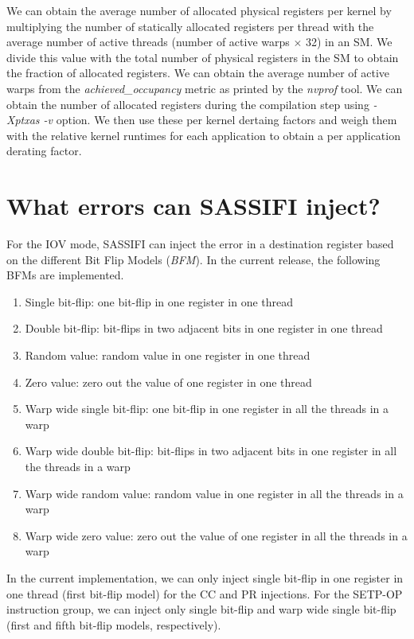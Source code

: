 We can obtain the average number of allocated physical registers per kernel by
multiplying the number of statically allocated registers per thread with the
average number of active threads (number of active warps $\times$ 32) in an SM.
We divide this value with the total number of physical registers in the SM to
obtain the fraction of allocated registers.  We can obtain the average number
of active warps from the {\it achieved\_occupancy} metric as printed by the
{\it nvprof} tool. We can obtain the number of allocated registers during the
compilation step using {\it -Xptxas -v} option. We then use these per kernel
dertaing factors and weigh them with the relative kernel runtimes for each
application to obtain a per application derating factor.

\section{What errors can SASSIFI inject?}
\label{sec:what}

For the IOV mode, SASSIFI can inject the error in a destination register based on
the different Bit Flip Models ({\it BFM}).  In the current release, the following BFMs are implemented. 

\begin{enumerate}
\item Single bit-flip: one bit-flip in one register in one thread
\item Double bit-flip: bit-flips in two adjacent bits in one register in one thread
\item Random value: random value in one register in one thread
\item Zero value: zero out the value of one register in one thread
\item Warp wide single bit-flip: one bit-flip in one register in all the threads in a warp
\item Warp wide double bit-flip: bit-flips in two adjacent bits in one register in all the threads in a warp
\item Warp wide random value: random value in one register in all the threads in a warp
\item Warp wide zero value: zero out the value of one register in all the threads in a warp
\end{enumerate}

In the current implementation, we can only inject single bit-flip in one
register in one thread (first bit-flip model) for the CC and PR injections. For
the SETP-OP instruction group, we can inject only single bit-flip and warp
wide single bit-flip (first and fifth bit-flip models, respectively).

